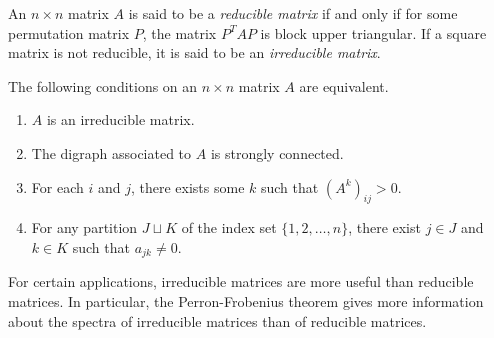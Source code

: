 \documentclass[12pt]{article}
\begin{document}
An $n\times n$ matrix $A$ is said to be a {\it reducible matrix} if and only if for some permutation matrix $P$, the matrix $P^TAP$ is block upper triangular.
If a square matrix is not reducible, it is said to be an {\it irreducible matrix}.  

The following conditions on an $n\times n$ matrix $A$ are equivalent.
\begin{enumerate}
\item
$A$ is an irreducible matrix.

\item
The digraph associated to $A$ is strongly connected.

\item
For each $i$ and $j$, there exists some $k$ such that $(A^k)_{ij}>0$.

\item
For any partition $J\sqcup K$ of the index set $\{1,2,\dots,n\}$, there exist $j\in J$ and $k\in K$ 
such that $a_{jk}\ne 0$.
\end{enumerate}

For certain applications, irreducible matrices are more useful than reducible matrices.  In particular, the Perron-Frobenius theorem gives more information about the spectra of irreducible matrices than of reducible matrices.
\end{document}
